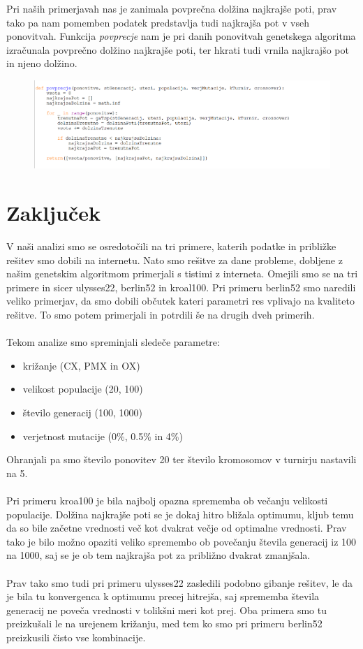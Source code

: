 \documentclass[12pt,a4paper]{amsart}
\theoremstyle{definition} %
\theoremstyle{plain} %
\begin{document}
Pri naših primerjavah nas je zanimala povprečna dolžina najkrajše poti, prav tako pa nam pomemben podatek predstavlja tudi najkrajša pot v vseh ponovitvah. Funkcija \textit{povprecje} nam je pri danih ponovitvah genetskega algoritma izračunala povprečno dolžino najkrajše poti, ter hkrati tudi vrnila najkrajšo pot in njeno dolžino.

\begin{figure}[ht]
\centering
\includegraphics[width=1\textwidth]{povprecje}
\end{figure}
\newpage

\section{Zaključek}

V naši analizi smo se osredotočili na tri primere, katerih podatke in približke rešitev smo dobili na internetu. Nato smo rešitve za dane probleme, dobljene z našim genetskim algoritmom primerjali s tistimi z interneta. Omejili smo se na tri primere in sicer ulysses22, berlin52 in kroal100. Pri primeru berlin52 smo naredili veliko primerjav, da smo dobili občutek kateri parametri res vplivajo na kvaliteto rešitve. To smo potem primerjali in potrdili še na drugih dveh primerih. 
\\
\\
Tekom analize smo spreminjali sledeče parametre:
\begin{itemize}
\item križanje (CX, PMX in OX)
\item velikost populacije (20, 100)
\item število generacij (100, 1000)
\item verjetnost mutacije (0\%, 0.5\% in 4\%)

 \end{itemize}
Ohranjali pa smo število ponovitev 20 ter število kromosomov v turnirju nastavili na 5.
\\
\\
Pri primeru kroa100 je bila najbolj opazna sprememba ob večanju velikosti populacije. Dolžina najkrajše poti se je dokaj hitro bližala optimumu, kljub temu da so bile začetne vrednosti več kot dvakrat večje od optimalne vrednosti. 
Prav tako je bilo možno opaziti veliko spremembo ob povečanju števila generacij iz 100 na 1000, saj se je ob tem najkrajša pot za približno dvakrat zmanjšala.
\\
\\
Prav tako smo tudi pri primeru ulysses22 zasledili podobno gibanje rešitev, le da je bila tu konvergenca k optimumu precej hitrejša, saj sprememba števila generacij ne poveča vrednosti v tolikšni meri kot prej. Oba primera smo tu preizkušali le na urejenem križanju, med tem ko smo pri primeru berlin52 preizkusili čisto vse kombinacije. 
\end{document}
